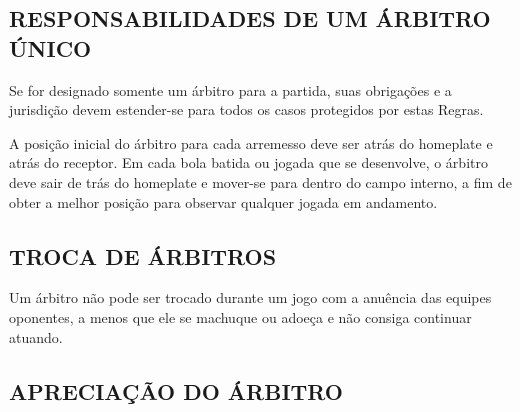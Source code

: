 \subsection{RESPONSABILIDADES DE UM ÁRBITRO ÚNICO}

Se for designado somente um árbitro para a partida, suas obrigações e a jurisdição devem estender-se para todos os casos protegidos por estas Regras.

A posição inicial do árbitro para cada arremesso deve ser atrás do \gls{homeplate} e atrás do receptor. Em cada bola batida ou jogada que se desenvolve, o árbitro deve sair de trás do \gls{homeplate} e mover-se para dentro do campo interno, a fim de obter a melhor posição para observar qualquer jogada em andamento.

\subsection{TROCA DE ÁRBITROS}
 Um árbitro não pode ser trocado durante um jogo com a anuência das equipes oponentes, a menos que ele se machuque ou adoeça e não consiga continuar atuando.

\subsection{APRECIAÇÃO DO ÁRBITRO}

